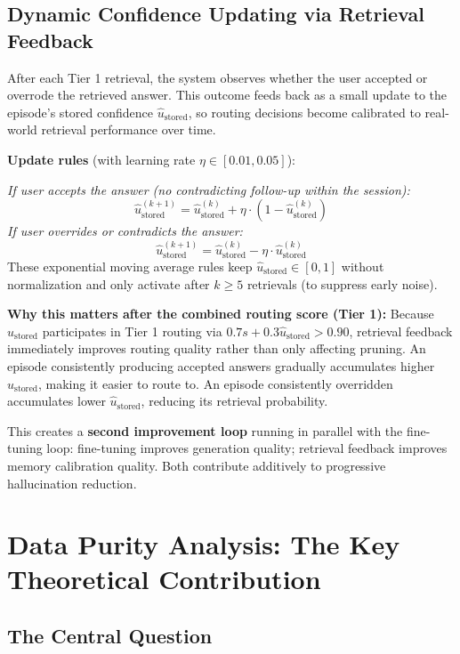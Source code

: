 \documentclass[12pt,a4paper]{article}
\theoremstyle{definition}
\newcommand{\ustored}{\hat{u}_{\text{stored}}}
\begin{document}
\subsection{Dynamic Confidence Updating via Retrieval Feedback}

After each Tier 1 retrieval, the system observes whether the user accepted or overrode the retrieved answer. This outcome feeds back as a small update to the episode's stored confidence $\ustored$, so routing decisions become calibrated to real-world retrieval performance over time.

\textbf{Update rules} (with learning rate $\eta \in [0.01, 0.05]$):

\textit{If user accepts the answer (no contradicting follow-up within the session):}
\[
\ustored^{(k+1)} = \ustored^{(k)} + \eta \cdot (1 - \ustored^{(k)})
\]
\textit{If user overrides or contradicts the answer:}
\[
\ustored^{(k+1)} = \ustored^{(k)} - \eta \cdot \ustored^{(k)}
\]
These exponential moving average rules keep $\ustored \in [0,1]$ without normalization and only activate after $k \geq 5$ retrievals (to suppress early noise).

\textbf{Why this matters after the combined routing score (Tier 1):} Because $\ustored$ participates in Tier 1 routing via $0.7s + 0.3\ustored > 0.90$, retrieval feedback immediately improves routing quality rather than only affecting pruning. An episode consistently producing accepted answers gradually accumulates higher $\ustored$, making it easier to route to. An episode consistently overridden accumulates lower $\ustored$, reducing its retrieval probability.

This creates a \textbf{second improvement loop} running in parallel with the fine-tuning loop: fine-tuning improves generation quality; retrieval feedback improves memory calibration quality. Both contribute additively to progressive hallucination reduction.

\newpage

\section{Data Purity Analysis: The Key Theoretical Contribution}

\subsection{The Central Question}
\end{document}
